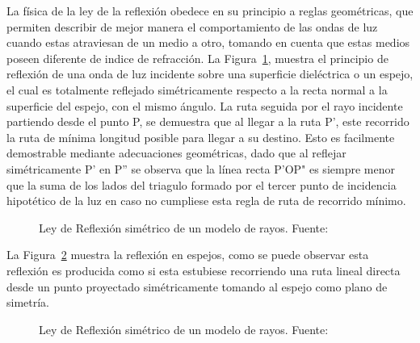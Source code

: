 \documentclass[letterpaper, 10 pt, conference]{ieeeconf}  %
\begin{document}
La f\'isica de la ley de la reflexi\'on obedece en su principio a reglas geom\'etricas, que permiten describir de mejor manera el comportamiento de las ondas de luz cuando estas atraviesan de un medio a otro, tomando en cuenta que estas medios poseen diferente de indice de refracci\'on. La Figura~\ref{fig:PrincipiGeometricoMinD}, muestra el principio de reflexi\'on de una onda de luz incidente sobre una superficie diel\'ectrica o un espejo, el cual es totalmente reflejado sim\'etricamente respecto a la recta normal a la superficie del espejo, con el mismo \'angulo. La ruta seguida por el rayo incidente partiendo desde el punto P, se demuestra que al llegar a la ruta P', este recorrido la ruta de m\'inima longitud posible para llegar a su destino. Esto es facilmente demostrable mediante adecuaciones geom\'etricas, dado que al reflejar sim\'etricamente P' en P'' se observa que la l\'inea recta P'OP" es siempre menor que la suma de los lados del triagulo formado por el tercer punto de incidencia hipot\'etico de la luz en caso no cumpliese esta regla de ruta de recorrido m\'inimo.
\begin{figure}[ht!]
\caption{Ley de Reflexi\'on sim\'etrico de un modelo de rayos. Fuente:~\cite{1}
}\label{fig:PrincipiGeometricoMinD}
\end{figure}
La Figura~\ref{fig:PrincipiGeometrico2} muestra la reflexi\'on en espejos, como se puede observar esta reflexi\'on es producida como si esta estubiese recorriendo una ruta lineal directa desde un punto proyectado sim\'etricamente tomando al espejo como plano de simetr\'ia.

\begin{figure}[ht!]
\caption{Ley de Reflexi\'on sim\'etrico de un modelo de rayos. Fuente:~\cite{1}
}\label{fig:PrincipiGeometrico2}
\end{figure}
\end{document}
